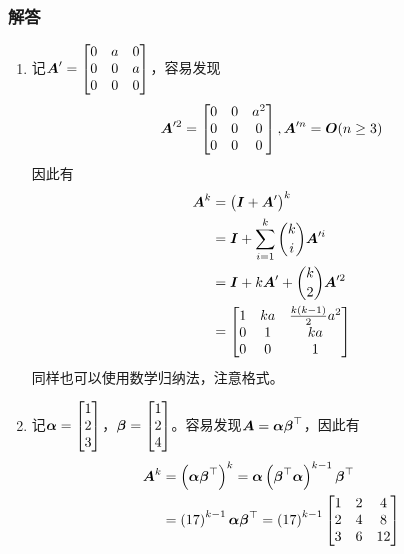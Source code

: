 \documentclass{beamer}
\begin{document}
\begin{frame}[allowframebreaks]
\frametitle{解答}

    \begin{enumerate}
        \item 记\(\boldsymbol{A}'=\begin{bmatrix}0&a&0\\0&0&a\\0&0&0\end{bmatrix}\)，容易发现
              \begin{equation*}
                  \boldsymbol{A}'^2=\begin{bmatrix}0&0&a^2\\0&0&0\\0&0&0\end{bmatrix},\boldsymbol{A}'^n=\boldsymbol{O}(n\ge3)
              \end{equation*}
              因此有
              \begin{align*}
                  \boldsymbol{A}^k & =\left( \boldsymbol{I}+\boldsymbol{A}' \right)^k                 \\
                          & =\boldsymbol{I}+\sum_{i=1}^k\binom{k}{i}\boldsymbol{A}'^i \\
                          & =\boldsymbol{I}+k\boldsymbol{A}'+\binom{k}{2}\boldsymbol{A}'^2     \\
                          & =\begin{bmatrix}
                      1 & ka & \frac{k(k-1)}{2}a^2 \\
                      0 & 1  & ka                  \\
                      0 & 0  & 1
                  \end{bmatrix}
              \end{align*}
同样也可以使用数学归纳法，注意格式。
              \pause
        \item 记\(\boldsymbol{\alpha}=\begin{bmatrix}1\\2\\3\end{bmatrix}\)，\(\boldsymbol{\beta}=\begin{bmatrix}1\\2\\4\end{bmatrix}\)。容易发现\(\boldsymbol{A}=\boldsymbol{\alpha}\boldsymbol{\beta}^\top\)，因此有
              \begin{align*}
                  \boldsymbol{A}^k & =\left( \boldsymbol{\alpha}\boldsymbol{\beta}^\top \right)^k=\boldsymbol{\alpha}\left( \boldsymbol{\beta}^\top\boldsymbol{\alpha} \right)^{k-1}\boldsymbol{\beta}^\top \\
                          & =\left( 17 \right)^{k-1}\boldsymbol{\alpha}\boldsymbol{\beta}^\top=\left( 17 \right)^{k-1}
                  \begin{bmatrix}
                      1 & 2 & 4 \\2&4&8\\3&6&12
                  \end{bmatrix}
              \end{align*}
    \end{enumerate}

\end{frame}
\end{document}
